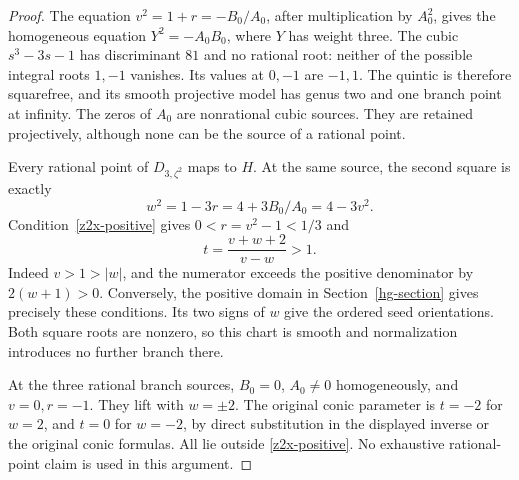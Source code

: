 \begin{proof}
The equation \(v^2=1+r=-B_0/A_0\), after multiplication by \(A_0^2\),
gives the homogeneous equation \(Y^2=-A_0B_0\), where \(Y\) has
weight three. The cubic \(s^3-3s-1\) has discriminant \(81\) and no
rational root: neither of the possible integral roots \(1,-1\)
vanishes. Its values at \(0,-1\) are \(-1,1\). The quintic is
therefore squarefree, and its smooth projective model has genus
two and one branch point at infinity. The zeros of \(A_0\) are
nonrational cubic sources. They are retained projectively, although
none can be the source of a rational point.

Every rational point of \(D_{3,\zeta^2}\) maps to \(H\). At the same
source, the second square is exactly
\[
 w^2=1-3r=4+3B_0/A_0=4-3v^2.
\]
Condition~\eqref{z2x-positive} gives \(0<r=v^2-1<1/3\) and
\[
 t=\frac{v+w+2}{v-w}>1.
\]
Indeed \(v>1>|w|\), and the numerator exceeds the positive
denominator by \(2(w+1)>0\). Conversely, the positive domain in
Section~\ref{hg-section} gives precisely these conditions. Its
two signs of \(w\) give the ordered seed orientations. Both square
roots are nonzero, so this chart is smooth and normalization
introduces no further branch there.

At the three rational branch sources, \(B_0=0\), \(A_0\ne0\)
homogeneously, and \(v=0,r=-1\). They lift with \(w=\pm2\).
The original conic parameter is \(t=-2\) for \(w=2\), and \(t=0\)
for \(w=-2\), by direct substitution in the displayed inverse or
the original conic formulas. All lie outside
\eqref{z2x-positive}. No exhaustive rational-point claim is used
in this argument.
\end{proof}

